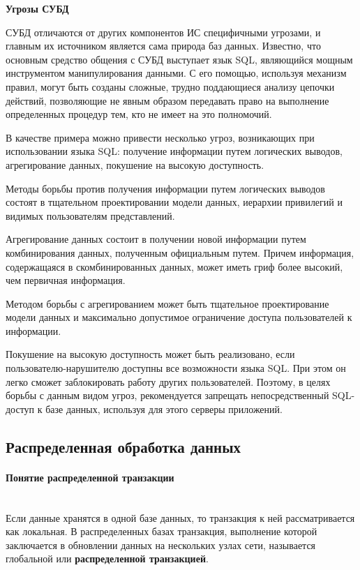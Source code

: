 \bigbreak
\textbf{Угрозы СУБД}

СУБД отличаются от других компонентов ИС специфичными угрозами, и главным их источником является сама природа баз данных. Известно, что основным средство общения с СУБД выступает язык SQL, являющийся мощным инструментом манипулирования данными. С его помощью, используя механизм правил, могут быть созданы сложные, трудно поддающиеся анализу цепочки действий, позволяющие не явным образом передавать право на выполнение определенных процедур тем, кто не имеет на это полномочий.

В качестве примера можно привести несколько угроз, возникающих при использовании языка SQL: получение информации путем логических выводов, агрегирование данных, покушение на высокую доступность.

Методы борьбы против получения информации путем логических выводов состоят в тщательном проектировании модели данных, иерархии привилегий и видимых пользователям представлений.

Агрегирование данных состоит в получении новой информации путем комбинирования данных, полученным официальным путем. Причем информация, содержащаяся в скомбинированных данных, может иметь гриф более высокий, чем первичная информация.

Методом борьбы с агрегированием может быть тщательное проектирование модели данных и максимально допустимое ограничение доступа пользователей к информации.

Покушение на высокую доступность может быть реализовано, если пользователю-нарушителю доступны все возможности языка SQL. При этом он легко сможет заблокировать работу других пользователей. Поэтому, в целях борьбы с данным видом угроз, рекомендуется запрещать непосредственный SQL-доступ к базе данных, используя для этого серверы приложений.


\subsection{Распределенная обработка данных}
\paragraph{Понятие распределенной транзакции}~\\
Если данные хранятся в одной базе данных, то транзакция к ней рассматривается как локальная.
В распределенных базах транзакция, выполнение которой заключается в обновлении данных на нескольких узлах сети,
называется глобальной или \textbf{распределенной транзакцией}.

